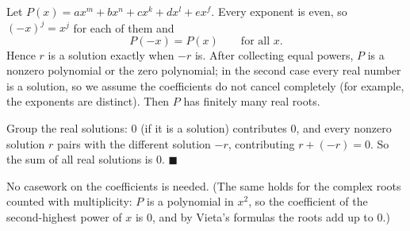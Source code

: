 Let $P(x)=ax^m+bx^n+cx^k+dx^l+ex^f$. Every exponent is even, so $(-x)^j=x^j$ for each of them and
\[
P(-x)=P(x)\qquad\text{for all }x .
\]
Hence $r$ is a solution exactly when $-r$ is. After collecting equal powers, $P$ is a nonzero polynomial or the zero polynomial; in the second case every real number is a solution, so we assume the coefficients do not cancel completely (for example, the exponents are distinct). Then $P$ has finitely many real roots.

Group the real solutions: $0$ (if it is a solution) contributes $0$, and every nonzero solution $r$ pairs with the different solution $-r$, contributing $r+(-r)=0$. So the sum of all real solutions is $0$. $\blacksquare$

No casework on the coefficients is needed. (The same holds for the complex roots counted with multiplicity: $P$ is a polynomial in $x^2$, so the coefficient of the second-highest power of $x$ is $0$, and by Vieta's formulas the roots add up to $0$.)
